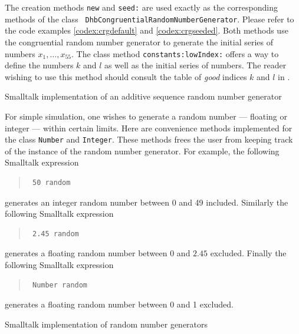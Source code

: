 \documentclass[twoside]{book}
\begin{document}
The creation methods {\tt new} and {\tt seed:} are used exactly as
the corresponding methods of the class {\tt
DhbCongruentialRandomNumberGenerator}. Please refer to the code
examples \ref{codex:crgdefault} and \ref{codex:crgseeded}. Both
methods use the congruential random number generator to generate
the initial series of numbers $x_1,\ldots,x_{55}$. The class
method {\tt constants:lowIndex:} offers a way to define the
numbers $k$ and $l$ as well as the initial series of numbers. The
reader wishing to use this method should consult the table of {\sl
good} indices $k$ and $l$ in \cite{Knuth2}.

\begin{listing} Smalltalk implementation of an additive sequence random number generator
\label{ls:randomseq}

\end{listing}

For simple simulation, one wishes to generate a random number ---
floating or integer --- within certain limits. Here are
convenience methods implemented for the class {\tt Number} and
{\tt Integer}. These methods frees the user from keeping track of
the instance of the random number generator. For example, the
following Smalltalk expression
\begin{quote}
\begin{verbatim}
 50 random
\end{verbatim}
\end{quote}
\noindent generates an integer random number between 0 and 49
included. Similarly the following Smalltalk expression
\begin{quote}
\begin{verbatim}
 2.45 random
\end{verbatim}
\end{quote}
\noindent generates a floating random number between 0 and $2.45$
excluded. Finally the following Smalltalk expression
\begin{quote}
\begin{verbatim}
 Number random
\end{verbatim}
\end{quote}
\noindent generates a floating random number between 0 and 1
excluded.
\begin{listing} Smalltalk implementation of random number generators
\label{ls:randomuse}


\end{listing}
\end{document}
